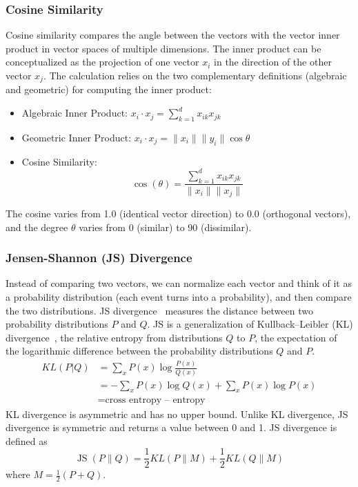 \subsubsection{Cosine Similarity}
\label{sec:cos_sim}
Cosine similarity compares the angle between the vectors with the vector inner product in vector spaces of multiple dimensions. The inner product can be conceptualized
as the projection of one vector $x_{i}$ in the direction of the other vector $x_{j}$. The calculation relies on the two complementary definitions (algebraic and geometric) for computing the inner product:
\begin{itemize}
\item 
Algebraic Inner Product:
$x_{i}\cdot x_{j}=\sum_{k=1}^{d} x_{ik} x_{jk}$
\item
Geometric Inner Product:
$x_{i}\cdot x_{j}=\|x_{i}\|\|y_{i}\|\cos\theta$
\item
Cosine Similarity:
\begin{equation}
\cos(\theta)=\frac{\sum_{k=1}^{d} x_{ik} x_{jk}}{\|x_{i}\|\|x_{j}\|}
\end{equation}
\end{itemize} 
The cosine varies from 1.0 (identical vector direction) to 0.0 (orthogonal vectors), and the degree $\theta$ varies from 0 (similar) to 90 (dissimilar).%

\subsubsection{Jensen-Shannon (JS) Divergence}
\label{sec:JS}
Instead of comparing two vectors, we can normalize each vector and think of it as a probability distribution (each event turns into a probability), and then compare the two distributions.
JS divergence~\cite{endres2003new} measures the distance between two probability distributions $P$ and $Q$. JS is a generalization of  Kullback–Leibler (KL) divergence~\cite{kullback1951information}, the relative entropy from distributions $Q$ to $P$, \ie the expectation of the logarithmic difference between the probability distributions $Q$ and $P$. 
\begin{align*}
KL(P|Q)&=\sum_{x} P(x) \log \frac{P(x)}{Q(x)} \\ 
&=-\sum_{x} P(x) \log {Q(x)}+\sum_{x} P(x) \log {P(x)} \\ 
& =\textrm{cross entropy – entropy}
\end{align*}
KL divergence is asymmetric and has no upper bound. Unlike KL divergence, JS divergence is symmetric and returns a value between 0 and 1. %
JS divergence is defined as 
\begin{equation}
\operatorname{JS}(P \| Q)=\frac{1}{2} KL(P \| M)+\frac{1}{2} KL(Q \| M)
\end{equation}
where $M=\frac{1}{2}(P+Q)$.%

